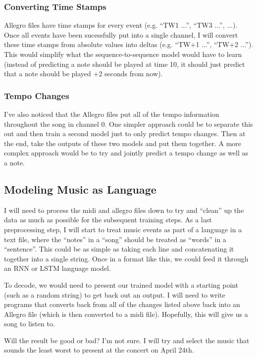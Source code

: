\documentclass[12pt]{article}
\begin{document}
\subsubsection{Converting Time Stamps}
Allegro files have time stamps for every event (e.g. ``TW1 ...'', ``TW3 ...'', ...). Once all events have been sucessfully put into a single channel, I will convert these time stamps from absolute values into deltas (e.g. ``TW+1 ...'', ``TW+2 ...''). This would simplify what the sequence-to-sequence model would have to learn (instead of predicting a note should be played at time 10, it should just predict that a note should be played +2 seconds from now).

\subsubsection{Tempo Changes}
I've also noticed that the Allegro files put all of the tempo information throughout the song in channel 0. One simpler approach could be to separate this out and then train a second model just to only predict tempo changes. Then at the end, take the outputs of these two models and put them together. A more complex approach would be to try and jointly predict a tempo change as well as a note.


\subsection{Modeling Music as Language}
I will need to process the midi and allegro files down to try and ``clean'' up the data as much as possible for the subsequent training steps.
As a last preprocessing step, I will start to treat music events as part of a language in a text file, where the ``notes'' in a ``song'' should be treated as ``words'' in a ``sentence''. This could be as simple as taking each line and concatenating it together into a single string. Once in a format like this, we could feed it through an RNN or LSTM language model.

To decode, we would need to present our trained model with a starting point (such as a random string) to get back out an output. I will need to write programs that converts back from all of the changes listed above back into an Allegro file (which is then converted to a midi file). Hopefully, this will give us a song to listen to.

Will the result be good or bad? I'm not sure. I will try and select the music that sounds the least worst to present at the concert on April 24th.
\end{document}
